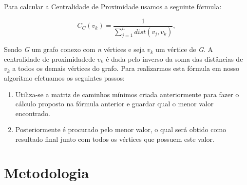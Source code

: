 \documentclass[12pt]{article}
\begin{document}
Para calcular a Centralidade de Proximidade usamos a seguinte fórmula:
\begin{center}
\begin{equation}
C_C(v_k)=\frac{1}{\sum\limits_{j = 1}^n dist(v_j,v_k)},
\end{equation}
\end{center}
Sendo {\it G} um grafo conexo com {\it n} vértices e seja $v_k$ um vértice de {\it G}. A centralidade de proximidadede $v_k$ é dada pelo inverso da soma das distâncias de $v_k$ a todos os demais vértices do grafo.
Para realizarmos esta fórmula em nosso algoritmo efetuamos os seguintes passos:
\begin{enumerate}
\item Utiliza-se a matriz de caminhos mínimos criada anteriormente para fazer o cálculo proposto na fórmula anterior e guardar qual o menor valor encontrado.
\item Posteriormente é procurado pelo menor valor, o qual será obtido como resultado final junto com todos os vértices que possuem este valor.
\end{enumerate}

\section{Metodologia}\label{sec:met}
\end{document}
